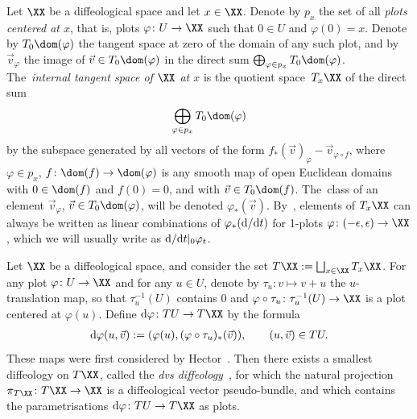 \begin{Definition}\label{tangentbundle}
Let $\XX$ be a diffeological space and let $x\in \XX$. Denote by $p_{x}$ the set of all \textit{plots centered at $x$}, that is, plots $\varphi\colon U\rightarrow \XX$ such that $0\in U$ and $\varphi(0) = x$. Denote by $T_{0}\dom(\varphi)$ the tangent space at zero of the domain of any such plot, and by $\vec{v}_{\varphi}$ the image of $\vec{v}\in T_{0}\dom(\varphi)$ in the direct sum $\bigoplus_{\varphi\in p_{x}}T_{0}\dom(\varphi)$. The~\textit{internal tangent space of $\XX$ at $x$} is the quotient space~$T_{x}\XX$ of the direct sum
\begin{gather*}
\bigoplus_{\varphi\in p_{x}} T_{0}\dom(\varphi)
\end{gather*}
by the subspace generated by all vectors of the form $f_{*}(\vec{v})_{\varphi} - \vec{v}_{\varphi\circ f}$, where $\varphi\in p_{x}$, $f\colon \dom(f)\rightarrow\dom(\varphi)$ is any smooth map of open Euclidean domains with $0\in\dom(f)$ and $f(0) = 0$, and with $\vec{v}\in T_{0}\dom(f)$. The~class of an element $\vec{v}_{\varphi}$, $\vec{v}\in T_{0}\dom(\varphi)$, will be denoted $\varphi_{*}(\vec{v})$. By~\cite[Proposition~3.3]{cw}, elements of $T_{x}\XX$ can always be written as linear combinations of $\varphi_{*}({\rm d}/{\rm d}t)$ for 1-plots $\varphi\colon (-\epsilon,\epsilon)\rightarrow\XX$, which we will usually write as ${\rm d}/{\rm d}t|_{0}\varphi_{t}$.
\end{Definition}

Let $\XX$ be a diffeological space, and consider the set $T\XX:=\bigsqcup_{x\in \XX}T_{x}\XX$. For any plot \mbox{$\varphi\colon U\rightarrow \XX$} and for any $u\in U$, denote by $\tau_{u}\colon v\mapsto v+u$ the $u$-translation map, so that $\tau_{u}^{-1}(U)$ contains $0$ and $\varphi\circ\tau_{u}\colon \tau_{u}^{-1}(U)\rightarrow \XX$ is a plot centered at $\varphi(u)$. Define ${\rm d}\varphi\colon TU\rightarrow T\XX$ by the formula
\begin{gather*}
{\rm d}\varphi(u,\vec{v}):=(\varphi(u),(\varphi\circ\tau_{u})_{*}(\vec{v})),\qquad (u,\vec{v})\in TU.
\end{gather*}
These maps were first considered by Hector~\cite{hector}. Then there exists a smallest diffeology on $T\XX$, called the \textit{dvs diffeology}~\cite{cw}, for which the natural projection $\pi_{T\XX}\colon T\XX\rightarrow \XX$ is a diffeological vector pseudo-bundle, and which contains the parametrisations ${\rm d}\varphi\colon TU\rightarrow T\XX$ as plots.

